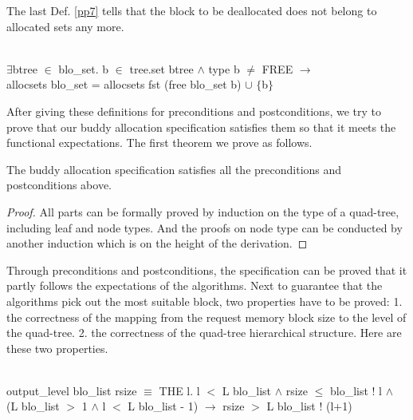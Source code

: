 The last Def. \ref{pp7} tells that the block to be deallocated does not belong to allocated sets any more.

\begin{definition}  \\
	$\exists$btree $\in$ blo\_set. b $\in$ tree.set btree $\wedge$ type b $\neq$ FREE $\longrightarrow$ \\
	\phantom{x} \hspace{10pt} allocsets blo\_set = allocsets fst (free blo\_set b) $\cup$ $\lbrace$b$\rbrace$
	\label{pp7}
\end{definition}

After giving these definitions for preconditions and postconditions, we try to prove that our buddy allocation specification satisfies them so that it meets the functional expectations. The first theorem we prove as follows.

\begin{theorem}
	The buddy allocation specification satisfies all the preconditions and postconditions above.
\end{theorem}

\begin{proof}
	All parts can be formally proved by induction on the type of a quad-tree, including leaf and node types. And the proofs on node type can be conducted by another induction which is on the height of the derivation.
\end{proof}

Through preconditions and postconditions, the specification can be proved that it partly follows the expectations of the algorithms. Next to guarantee that the algorithms pick out the most suitable block, two properties have to be proved: 1. the correctness of the mapping from the request memory block size to the level of the quad-tree. 2. the correctness of the quad-tree hierarchical structure. Here are these two properties.

\begin{definition}  \\
	output\_level blo\_list rsize $\equiv$ THE l. l $<$ L blo\_list $\wedge$ rsize $\le$ blo\_list ! l $\wedge$ \\
	\phantom{x} \hspace{10pt} (L blo\_list $>$ 1 $\wedge$ l $<$ L blo\_list - 1) $\longrightarrow$ rsize $>$ L blo\_list ! (l+1)
\end{definition}

